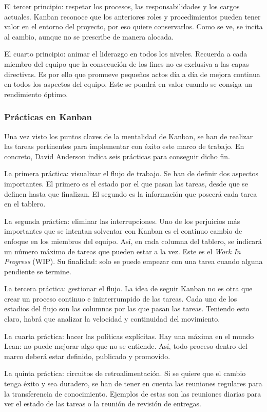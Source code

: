 El tercer principio: respetar los procesos, las responsabilidades y los cargos actuales. Kanban reconoce que los anteriores roles y procedimientos pueden tener valor en el entorno del proyecto, por eso quiere conservarlos. Como se ve, se incita al cambio, aunque no se prescribe de manera alocada.

El cuarto principio: animar el liderazgo en todos los niveles. Recuerda a cada miembro del equipo que la consecución de los fines no es exclusiva a las capas directivas. Es por ello que promueve pequeños actos día a día de mejora continua en todos los aspectos del equipo. Este se pondrá en valor cuando se consiga un rendimiento óptimo.

\subsubsection{Prácticas en Kanban}
Una vez visto los puntos claves de la mentalidad de Kanban, se han de realizar las tareas pertinentes para implementar con éxito este marco de trabajo. En concreto, David Anderson indica seis prácticas para conseguir dicho fin.

La primera práctica: visualizar el flujo de trabajo. Se han de definir dos aspectos importantes. El primero es el estado por el que pasan las tareas, desde que se definen hasta que finalizan. El segundo es la información que poseerá cada tarea en el tablero.

La segunda práctica: eliminar las interrupciones. Uno de los perjuicios más importantes que se intentan solventar con Kanban es el continuo cambio de enfoque en los miembros del equipo. Así, en cada columna del tablero, se indicará un número máximo de tareas que pueden estar a la vez. Este es el \textit{Work In Progress} (WIP). Su finalidad: solo se puede empezar con una tarea cuando alguna pendiente se termine.

La tercera práctica: gestionar el flujo. La idea de seguir Kanban no es otra que crear un proceso continuo e ininterrumpido de las tareas. Cada uno de los estadios del flujo son las columnas por las que pasan las tareas. Teniendo esto claro, habrá que analizar la velocidad y continuidad del movimiento.

La cuarta práctica: hacer las políticas explícitas. Hay una máxima en el mundo Lean: no puede mejorar algo que no se entiende. Así, todo proceso dentro del marco deberá estar definido, publicado y promovido.

La quinta práctica: circuitos de retroalimentación. Si se quiere que el cambio tenga éxito y sea duradero, se han de tener en cuenta las reuniones regulares para la transferencia de conocimiento. Ejemplos de estas son las reuniones diarias para ver el estado de las tareas o la reunión de revisión de entregas.

